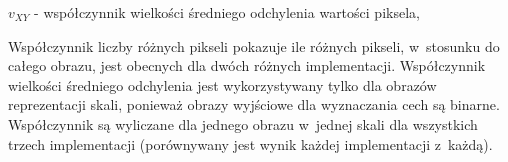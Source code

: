 $ v_{XY} $ - współczynnik wielkości średniego odchylenia wartości piksela,

Współczynnik liczby różnych pikseli pokazuje ile różnych pikseli, w~stosunku do całego obrazu, jest obecnych dla dwóch różnych implementacji. Współczynnik wielkości średniego odchylenia jest wykorzystywany tylko dla obrazów reprezentacji skali, ponieważ obrazy wyjściowe dla wyznaczania cech są binarne. Współczynnik są wyliczane dla jednego obrazu w~jednej skali dla wszystkich trzech implementacji (porównywany jest wynik każdej implementacji z~każdą).
